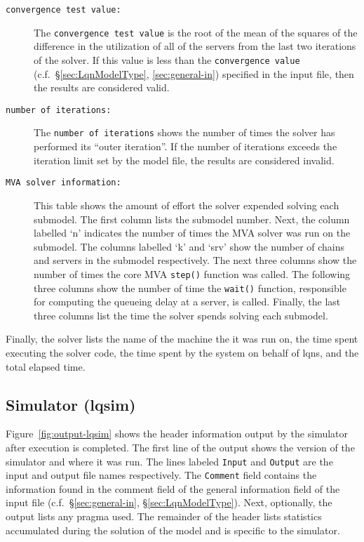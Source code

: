 \begin{description}
\item[\texttt{convergence test value:}] The \texttt{convergence test
    value} is the root of the mean of
  the squares of the difference in the utilization of all of the
  servers from the last two iterations of the solver.  If this value
  is less than the \texttt{convergence value}
  (c.f.~\S\ref{sec:LqnModelType}, \ref{sec:general-in}) specified in
  the input file, then the results are considered
  valid.
\item[\texttt{number of iterations:}] The \texttt{number of
    iterations} shows the number of times
  the solver has performed its ``outer iteration''.  If the number of
  iterations exceeds the iteration limit set by
  the model file, the results are considered invalid.
\item[\texttt{MVA solver information:}] This table shows the amount of
  effort the solver expended solving each submodel.  The first column
  lists the submodel number.  Next, the column labelled `n' indicates
  the number of times the MVA solver was run on the submodel.  The
  columns labelled `k' and `srv' show the number of
  chains and servers in the submodel respectively.  The
  next three columns show the number of times the core MVA
  \texttt{step()} function was called.
  The following three columns show the number of time the
  \texttt{wait()} function, responsible
  for computing the queueing delay at a server, is called.  Finally,
  the last three columns list the time the solver spends solving each
  submodel.
\end{description}
Finally, the solver lists the name of the machine the it was run on,
the time spent executing the solver code, the time spent by the system
on behalf of lqns, and the total elapsed time.

\subsection{Simulator (lqsim)}
\label{sec:simulator-header-out}

Figure~\ref{fig:output-lqsim} shows the header information output by
the simulator after execution is completed.  The first line of the
output shows the version of the simulator and where it was run.  The
lines labeled \texttt{Input} and \texttt{Output} are the input and
output file names respectively.  The \texttt{Comment} field contains
the information found in the comment field of the general information
field of the input file (c.f.~\S\ref{sec:general-in},
\S\ref{sec:LqnModelType}).  Next, optionally, the output lists
any pragma used.  The remainder of the header lists statistics
accumulated during the solution of the model and is specific to the
simulator.

